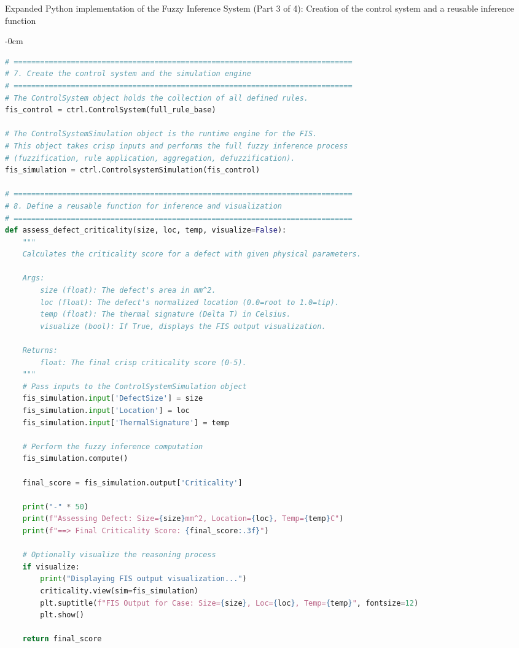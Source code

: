 \documentclass[energies,supfile,submit,pdftex,moreauthors]{Definitions/mdpi}
\begin{document}
\begin{listing}[H]
\caption{Expanded Python implementation of the Fuzzy Inference System (Part 3 of 4): Creation of the control system and a reusable inference function}
\label{lst:scikit-code-part3}
\begin{adjustwidth}{-\extralength}{0cm}
\begin{lstlisting}[language=Python, style=mystyle]
# =============================================================================
# 7. Create the control system and the simulation engine
# =============================================================================
# The ControlSystem object holds the collection of all defined rules.
fis_control = ctrl.ControlSystem(full_rule_base)

# The ControlSystemSimulation object is the runtime engine for the FIS.
# This object takes crisp inputs and performs the full fuzzy inference process
# (fuzzification, rule application, aggregation, defuzzification).
fis_simulation = ctrl.ControlsystemSimulation(fis_control)

# =============================================================================
# 8. Define a reusable function for inference and visualization
# =============================================================================
def assess_defect_criticality(size, loc, temp, visualize=False):
    """
    Calculates the criticality score for a defect with given physical parameters.

    Args:
        size (float): The defect's area in mm^2.
        loc (float): The defect's normalized location (0.0=root to 1.0=tip).
        temp (float): The thermal signature (Delta T) in Celsius.
        visualize (bool): If True, displays the FIS output visualization.

    Returns:
        float: The final crisp criticality score (0-5).
    """
    # Pass inputs to the ControlSystemSimulation object
    fis_simulation.input['DefectSize'] = size
    fis_simulation.input['Location'] = loc
    fis_simulation.input['ThermalSignature'] = temp

    # Perform the fuzzy inference computation
    fis_simulation.compute()

    final_score = fis_simulation.output['Criticality']
    
    print("-" * 50)
    print(f"Assessing Defect: Size={size}mm^2, Location={loc}, Temp={temp}C")
    print(f"==> Final Criticality Score: {final_score:.3f}")
    
    # Optionally visualize the reasoning process
    if visualize:
        print("Displaying FIS output visualization...")
        criticality.view(sim=fis_simulation)
        plt.suptitle(f"FIS Output for Case: Size={size}, Loc={loc}, Temp={temp}", fontsize=12)
        plt.show()
        
    return final_score
\end{lstlisting}
\end{adjustwidth}
\end{listing}
\end{document}
